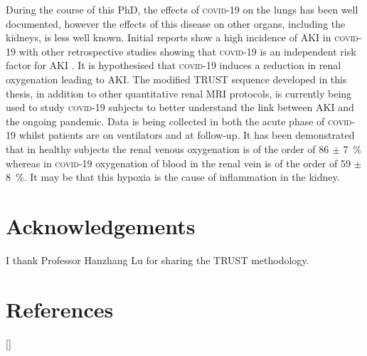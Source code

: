 During the course of this PhD, the effects of \textsc{covid}-19 on the lungs has been well documented, however the effects of this disease on other organs, including the kidneys, is less well known. Initial reports show a high incidence of \ac{AKI} in \textsc{covid}-19 \cite{selby_covid-19_2020, fisher_aki_2020, gabarre_acute_2020} with other retrospective studies showing that \textsc{covid}-19 is an independent risk factor for \ac{AKI} \cite{kolhe_acute_2020-1, adapa_covid-19_2020}. It is hypothesised that \textsc{covid}-19 induces a reduction in renal oxygenation leading to \ac{AKI}. The modified \ac{TRUST} sequence developed in this thesis, in addition to other quantitative renal \ac{MRI} protocols, is currently being used to study \textsc{covid}-19 subjects to better understand the link between \ac{AKI} and the ongoing pandemic. Data is being collected in both the acute phase of \textsc{covid}-19 whilst patients are on ventilators and at follow-up. It has been demonstrated that in healthy subjects the renal venous oxygenation is of the order of 86 $\pm$ 7~\% whereas in \textsc{covid}-19 oxygenation of blood in the renal vein is of the order of 59 $\pm$ 8~\%. It may be that this hypoxia is the cause of inflammation in the kidney.

\section{Acknowledgements}

I thank Professor Hanzhang Lu for sharing the TRUST methodology.

\newpage
\section{References}
[\refname]{}
\printbibliography